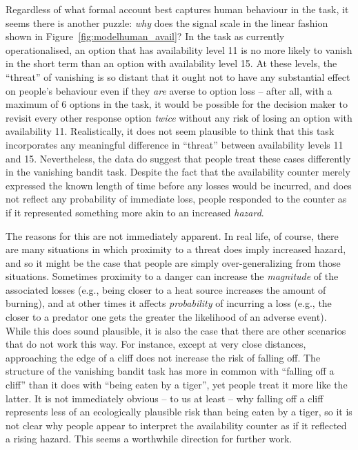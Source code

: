 \documentclass[a4paper,doc,natbib]{apa6}
\begin{document}
Regardless of what formal account best captures human behaviour in the task, it seems there is another puzzle: {\it why} does the signal scale in the linear fashion shown in Figure~\ref{fig:modelhuman_avail}? In the task as currently operationalised, an option that has availability level 11 is no more likely to vanish in the short term than an option with availability level 15. At these levels, the ``threat'' of vanishing is so distant that it ought not to have any substantial effect on people's behaviour even if they {\it are} averse to option loss -- after all, with a maximum of 6 options in the task, it would be possible for the decision maker to revisit  every other response option {\it twice} without any risk of losing an option with availability 11. Realistically, it does not seem plausible to think that this task incorporates any meaningful difference in ``threat'' between availability levels 11 and 15. Nevertheless, the data do  suggest that people treat these cases differently in the vanishing bandit task. Despite the fact that the availability counter merely expressed the known length of time before any losses would be incurred, and does not reflect any probability of immediate loss, people responded to the counter as if it represented something more akin to an increased {\it hazard}.

The reasons for this are not immediately apparent. In real life, of course, there are many situations in which proximity to a threat does imply increased hazard, and so it might be the case that people are simply over-generalizing from those situations. Sometimes proximity to a danger can increase the {\it magnitude} of the associated losses (e.g., being closer to a heat source increases the amount of burning), and at other times it affects {\it probability} of incurring a loss (e.g., the closer to a predator one gets the greater the likelihood of an adverse event). While this does sound plausible, it is also the case that there are other scenarios that do not work this way. For instance, except at very close distances, approaching the edge of a cliff does not increase the risk of falling off. The structure of the vanishing bandit task has more in common with ``falling off a cliff'' than it does with ``being eaten by a tiger'', yet people treat it more like the latter. It is not immediately obvious -- to us at least -- why falling off a cliff represents less of an ecologically plausible risk than being eaten by a tiger, so it is not clear why people appear to interpret the availability counter as if it reflected a rising hazard. This seems a worthwhile direction for further work.
\end{document}
